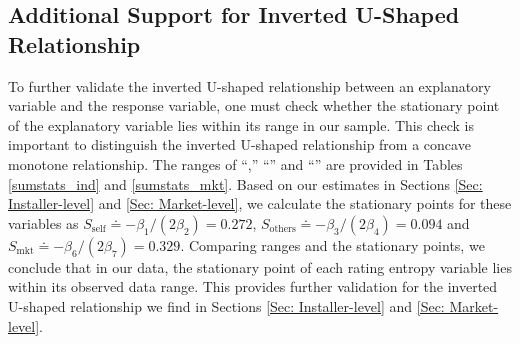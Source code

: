 \documentclass[msom,blindrev]{informs3}
\begin{document}
	
	
	
	
	\subsection{Additional Support for Inverted U-Shaped Relationship}
	
	To further validate the inverted U-shaped relationship between an explanatory variable and the response variable, one must check whether the stationary point of the explanatory variable lies within its range in our sample. This check is important to distinguish the inverted U-shaped relationship from a concave monotone relationship.  The ranges of ``,'' ``'' and ``'' are provided in Tables \ref{sumstats_ind} and \ref{sumstats_mkt}.
	Based on our estimates in Sections \ref{Sec: Installer-level} and \ref{Sec: Market-level}, we calculate the stationary points for these variables as $S_{\text{self}} \doteq - \beta_{1}/ (2 \beta_{2}) = 0.272$, $S_{\text{others}} \doteq  - \beta_{3}/(2 \beta_{4}) =0.094 $ and $S_{\text{mkt}} \doteq - \beta_{6}/(2 \beta_{7}) =0.329$. Comparing ranges and the stationary points, we conclude that in our data, the stationary point of each rating entropy variable lies within its observed data range. This provides further validation for the inverted U-shaped relationship we find in Sections \ref{Sec: Installer-level} and \ref{Sec: Market-level}.

	
\end{document}
